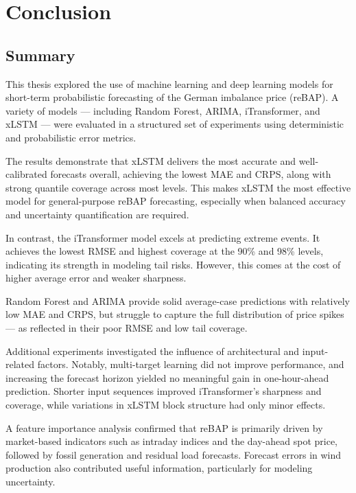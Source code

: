 \documentclass[class=scrbook, crop=false]{standalone}
\begin{document}
\chapter{Conclusion} %
\label{Chapter::Conclusion}

\section{Summary}
\label{Section::Summary}
This thesis explored the use of machine learning and deep learning models for short-term probabilistic forecasting of the German imbalance price (reBAP). A variety of models — including Random Forest, ARIMA, iTransformer, and xLSTM — were evaluated in a structured set of experiments using deterministic and probabilistic error metrics.

The results demonstrate that xLSTM delivers the most accurate and well-calibrated forecasts overall, achieving the lowest MAE and CRPS, along with strong quantile coverage across most levels. This makes xLSTM the most effective model for general-purpose reBAP forecasting, especially when balanced accuracy and uncertainty quantification are required.

In contrast, the iTransformer model excels at predicting extreme events. It achieves the lowest RMSE and highest coverage at the 90\% and 98\% levels, indicating its strength in modeling tail risks. However, this comes at the cost of higher average error and weaker sharpness.

Random Forest and ARIMA provide solid average-case predictions with relatively low MAE and CRPS, but struggle to capture the full distribution of price spikes — as reflected in their poor RMSE and low tail coverage. 

Additional experiments investigated the influence of architectural and input-related factors. Notably, multi-target learning did not improve performance, and increasing the forecast horizon yielded no meaningful gain in one-hour-ahead prediction. Shorter input sequences improved iTransformer’s sharpness and coverage, while variations in xLSTM block structure had only minor effects.

A feature importance analysis confirmed that reBAP is primarily driven by market-based indicators such as intraday indices and the day-ahead spot price, followed by fossil generation and residual load forecasts. Forecast errors in wind production also contributed useful information, particularly for modeling uncertainty.
\end{document}
